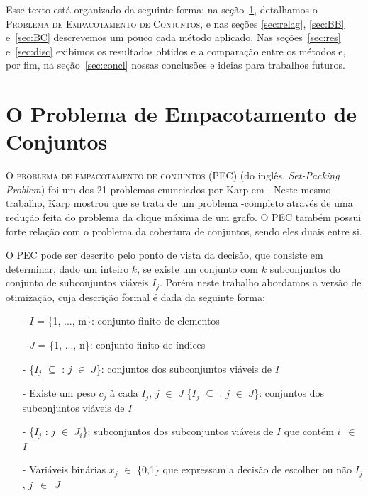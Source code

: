 \documentclass{article}
\begin{document}
	Esse texto está organizado da seguinte forma: na seção~\ref{sec:prob}, detalhamos o \textsc{Problema de Empacotamento de Conjuntos}, e nas seções \ref{sec:relag}, \ref{sec:BB} e~\ref{sec:BC} descrevemos um pouco cada método aplicado. Nas seções~\ref{sec:res} e~\ref{sec:disc} exibimos os resultados obtidos e a comparação entre os métodos e, por fim, na seção~\ref{sec:concl} nossas conclusões e ideias para trabalhos futuros.
	
	
	\section{O Problema de Empacotamento de Conjuntos}\label{sec:prob}
	O \textsc{problema de empacotamento de conjuntos} (PEC) (do inglês, \emph{Set-Packing Problem}) foi um dos 21 problemas enunciados por Karp em \cite{Karp}. Neste mesmo trabalho, Karp mostrou que se trata de um problema \NP-completo através de uma redução feita do {\color{red} problema da clique máxima de um grafo}. O PEC também possui forte relação com o {\color{red} problema da cobertura de conjuntos}, {\color{red} sendo eles duais entre si}.
	
	{\color{red} O PEC pode ser descrito pelo ponto de vista da decisão, que} consiste em determinar, dado um inteiro $k$, se existe um conjunto com $k$ subconjuntos do conjunto de subconjuntos viáveis $I_j$. 
	Porém neste trabalho abordamos a versão de otimização, {\color{red} cuja} descrição formal é dada da seguinte forma:
	
	\begin{itemize}
	    \item[-] $I$ = \{1, ..., m\}: conjunto finito de elementos
	    
	    \item[-] $J$ = \{1, ..., n\}: conjunto finito de índices
	    
	    \item[-] \{$I_j$ $\subseteq$ : $j$ $\in$ $J$\}: conjuntos dos subconjuntos viáveis de $I$
	    
	    \item[-] Existe um peso $c_j$ à cada $I_j$, $j$ $\in$ $J$
	    \{$I_j$ $\subseteq$ : $j$ $\in$ $J$\}: conjuntos dos subconjuntos viáveis de $I$
	    
	    \item[-] \{$I_j$ : $j$ $\in$ $J_i$\}: subconjuntos dos subconjuntos viáveis de $I$ que contém $i$~$\in$~$I$
	    \item[-] Variáveis binárias $x_j$ $\in$ \{0,1\} que expressam a decisão de escolher ou não $I_j$, $j$~$\in$~$J$
	\end{itemize}
	
\end{document}
